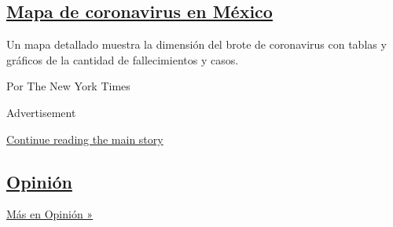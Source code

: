 \begin{enumerate}
  \hypertarget{mapa-de-coronavirus-en-muxe9xico}{%
  \subsection{\texorpdfstring{\href{/es/interactive/2020/espanol/america-latina/coronavirus-en-mexico.html}{Mapa
  de coronavirus en
  México}}{Mapa de coronavirus en México}}\label{mapa-de-coronavirus-en-muxe9xico}}

  Un mapa detallado muestra la dimensión del brote de coronavirus con
  tablas y gráficos de la cantidad de fallecimientos y casos.

  Por The New York Times
\end{enumerate}

Advertisement

\protect\hyperlink{after-mid1}{Continue reading the main story}

\hypertarget{opiniuxf3n}{%
\subsection{\texorpdfstring{\href{/es/section/opinion}{Opinión}}{Opinión}}\label{opiniuxf3n}}

\href{/es/section/opinion}{Más en Opinión »}

